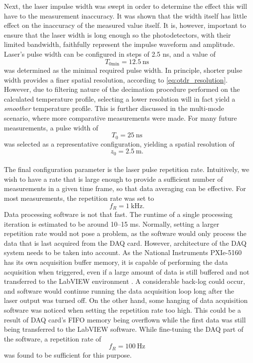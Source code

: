 \documentclass{standalone}
\begin{document}
Next, the laser impulse width was swept in order to determine the effect this will have to the measurement inaccuracy. It was shown that the width itself has little effect on the inaccuracy of the measured value itself. It is, however, important to ensure that the laser width is long enough so the photodetectors, with their limited bandwidth, faithfully represent the impulse waveform and amplitude. Laser's pulse width can be configured in steps of 2.5 ns, and a value of
\begin{equation}
T_{0\textrm{min}} = \SI{12.5}{\nano \second}
\end{equation}
was determined as the minimal required pulse width. In principle, shorter pulse width provides a finer spatial resolution, according to \ref{eq:otdr_resolution}. However, due to filtering nature of the decimation procedure performed on the calculated temperature profile, selecting a lower resolution will in fact yield a \textit{smoother} temperature profile. This is further discussed in the multi-mode scenario, where more comparative measurements were made. For many future measurements, a pulse width of
\begin{equation}
T_0 = \SI{25}{\nano \second}
\end{equation}
was selected as a representative configuration, yielding a spatial resolution of
\begin{equation}
z_0 = \SI{2.5}{\meter} \textrm{.}
\end{equation} \\

The final configuration parameter is the laser pulse repetition rate. Intuitively, we wish to have a rate that is large enough to provide a sufficient number of measurements in a given time frame, so that data averaging can be effective. For most measurements, the repetition rate was set to
\begin{equation}
f_R = \SI{1}{\kilo \hertz} \textrm{.}
\end{equation}
Data processing software is not that fast. The runtime of a single processing iteration is estimated to be around 10--15 ms. Normally, setting a larger repetition rate would not pose a problem, as the software would only process the data that is last acquired from the DAQ card. However, architecture of the DAQ system needs to be taken into account. As the National Instruments PXIe-5160 has its own acquisition buffer memory, it is capable of performing the data acquisition when triggered, even if a large amount of data is still buffered and not transferred to the LabVIEW environment \cite{datasheet:daq}. A considerable back-log could occur, and software would continue running the data acquisition loop long after the laser output was turned off. On the other hand, some hanging of data acquisition software was noticed when setting the repetition rate too high. This could be a result of DAQ card's FIFO memory being overflown while the first data was still being transferred to the LabVIEW software. While fine-tuning the DAQ part of the software, a repetition rate of
\begin{equation}
f_R = \SI{100}{\hertz}
\end{equation}
was found to be sufficient for this purpose. \\
\end{document}
